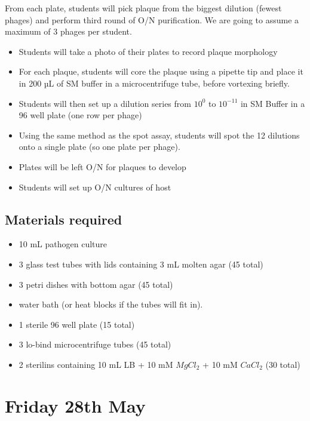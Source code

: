 \documentclass[
]{book}
\providecommand{\tightlist}{%
  \setlength{\itemsep}{0pt}\setlength{\parskip}{0pt}}
\begin{document}
From each plate, students will pick plaque from the biggest dilution (fewest phages) and perform third round of O/N purification. We are going to assume a maximum of 3 phages per student.

\begin{itemize}
\tightlist
\item
  Students will take a photo of their plates to record plaque morphology
\item
  For each plaque, students will core the plaque using a pipette tip and place it in 200 µL of SM buffer in a microcentrifuge tube, before vortexing briefly.
\item
  Students will then set up a dilution series from \(10^{0}\) to \(10^{-11}\) in SM Buffer in a 96 well plate (one row per phage)
\item
  Using the same method as the spot assay, students will spot the 12 dilutions onto a single plate (so one plate per phage).
\item
  Plates will be left O/N for plaques to develop
\item
  Students will set up O/N cultures of host
\end{itemize}

\hypertarget{materials-required-8}{%
\subsection{Materials required}\label{materials-required-8}}

\begin{itemize}
\tightlist
\item
  10 mL pathogen culture
\item
  3 glass test tubes with lids containing 3 mL molten agar (45 total)
\item
  3 petri dishes with bottom agar (45 total)
\item
  water bath (or heat blocks if the tubes will fit in).
\item
  1 sterile 96 well plate (15 total)
\item
  3 lo-bind microcentrifuge tubes (45 total)
\item
  2 sterilins containing 10 mL LB + 10 mM \(MgCl_{2}\) + 10 mM \(CaCl_{2}\) (30 total)
\end{itemize}

\hypertarget{friday-28th-may}{%
\section{Friday 28th May}\label{friday-28th-may}}
\end{document}
